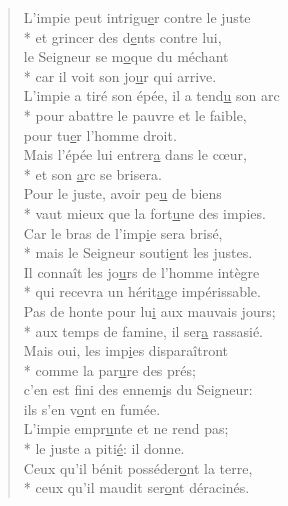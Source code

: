 \begin{verse}
L’impie peut intrigu\underline{e}r contre le juste \\*
et grincer des d\underline{e}nts contre lui, \\
le Seigneur se m\underline{o}que du méchant \\*
car il voit son jo\underline{u}r qui arrive. \\

L’impie a tiré son épée, il a tend\underline{u} son arc \\*
pour abattre le pauvre et le faible, \\
pour tu\underline{e}r l’homme droit. \\
Mais l’épée lui entrer\underline{a} dans le cœur, \\*
et son \underline{a}rc se brisera. \\

Pour le juste, avoir pe\underline{u} de biens \\*
vaut mieux que la fort\underline{u}ne des impies. \\
Car le bras de l’imp\underline{i}e sera brisé, \\*
mais le Seigneur souti\underline{e}nt les justes. \\

Il connaît les jo\underline{u}rs de l’homme intègre \\*
qui recevra un hérit\underline{a}ge impérissable. \\
Pas de honte pour lu\underline{i} aux mauvais jours; \\*
aux temps de famine, il ser\underline{a} rassasié. \\

Mais oui, les imp\underline{i}es disparaîtront \\*
comme la par\underline{u}re des prés; \\
c’en est fini des ennem\underline{i}s du Seigneur: \\
ils s’en v\underline{o}nt en fumée. \\

L’impie empr\underline{u}nte et ne rend pas; \\*
le juste a piti\underline{é}: il donne. \\
Ceux qu’il bénit posséder\underline{o}nt la terre, \\*
ceux qu’il maudit ser\underline{o}nt déracinés. \\


\end{verse}
